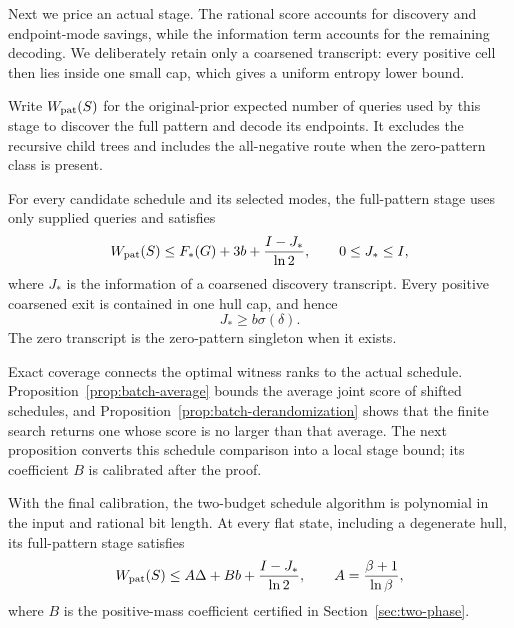 Next we price an actual stage. The rational score accounts for
discovery and endpoint-mode savings, while the information term
accounts for the remaining decoding. We deliberately retain only
a coarsened transcript: every positive cell then lies inside one
small cap, which gives a uniform entropy lower bound.

Write $W_{\rm pat}(S)$ for the original-prior expected number of
queries used by this stage to discover the full pattern and decode its
endpoints. It excludes the recursive child trees and includes the
all-negative route when the zero-pattern class is present.

\begin{proposition}
\label{prop:expected-stage}
For every candidate schedule and its selected modes, the full-pattern
stage uses only supplied queries and satisfies
\begin{equation}\label{eq:adaptive-stage}
 W_{\rm pat}(S)\le F_*(G)+3b+\frac{I-J_*}{\ln2},
 \qquad 0\le J_*\le I,
\end{equation}
where $J_*$ is the information of a coarsened discovery transcript.
Every positive coarsened exit is contained in one hull cap, and hence
\begin{equation}\label{eq:coarse-discovery-cap}
 J_*\ge b\sigma(\delta).
\end{equation}
The zero transcript is the zero-pattern singleton when it exists.
\end{proposition}

Exact coverage connects the optimal witness ranks to the actual
schedule. Proposition~\ref{prop:batch-average} bounds the average joint
score of shifted schedules, and Proposition~\ref{prop:batch-derandomization}
shows that the finite search returns one whose score is no larger than
that average. The next proposition converts this schedule comparison
into a local stage bound; its coefficient $B$ is calibrated after the
proof.
\begin{proposition}
\label{prop:expected-schedule}
With the final calibration, the two-budget schedule algorithm is
polynomial in the input and rational bit length. At every flat state,
including a degenerate hull, its full-pattern stage satisfies
\begin{equation}\label{eq:two-phase-local}
 W_{\rm pat}(S)\le A\Delta+B b+\frac{I-J_*}{\ln2},
 \qquad A=\frac{\beta+1}{\ln\beta},
\end{equation}
where $B$ is the positive-mass coefficient certified in
Section~\ref{sec:two-phase}.
\end{proposition}

